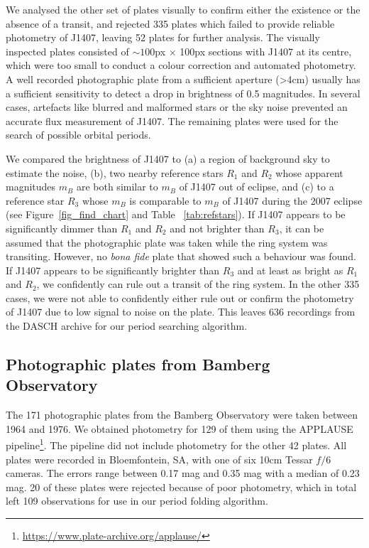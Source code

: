 \documentclass[twocolumn]{aa}
\begin{document}
We analysed the other set of plates visually to confirm either the existence or the absence of a transit, and rejected 335 plates which failed to provide reliable photometry of J1407, leaving 52 plates for further analysis.
%
The visually inspected plates consisted of $\sim 100$px $\times$ 100px sections with J1407 at its centre, which were too small to conduct a colour correction and automated photometry.
%
A well recorded photographic plate from a sufficient aperture (>4cm) usually has a sufficient sensitivity to  detect a drop in brightness of 0.5 magnitudes.
%
In several cases, artefacts like blurred and malformed stars or the sky noise prevented an accurate flux measurement of J1407.
%
The remaining plates were used for the search of possible orbital periods.

We compared the brightness of J1407 to (a) a region of background sky to estimate the noise, (b), two nearby reference stars $R_1$ and $R_2$ whose apparent magnitudes $m_B$ are both similar to $m_B$ of J1407 out of eclipse, and (c) to a reference star $R_3$ whose $m_B$ is comparable to $m_B$ of J1407 during the 2007 eclipse (see Figure~\ref{fig_find_chart} and Table ~\ref{tab:refstars}).
%
If J1407 appears to be significantly dimmer than $R_1$ and $R_2$ and not brighter than $R_3$, it can be assumed that the photographic plate was taken while the ring system was transiting.
%
However, no {\it bona fide} plate that showed such a behaviour was found.
%
If J1407 appears to be significantly brighter than $R_3$ and at least as bright as $R_1$ and $R_2$, we confidently can rule out a transit of the ring system.
% 
In the other 335 cases, we were not able to confidently either rule out or confirm the photometry of J1407 due to low signal to noise on the plate. This leaves 636 recordings from the DASCH archive for our period searching algorithm.

\subsection{Photographic plates from Bamberg Observatory}

The 171 photographic plates from the Bamberg Observatory were taken between 1964 and 1976.
%
We obtained photometry for 129 of them using the APPLAUSE pipeline\footnote{\url{https://www.plate-archive.org/applause/}}.
%
The pipeline did not include photometry for the other 42 plates.
%
All plates were recorded in Bloemfontein, SA, with one of six 10cm Tessar $f/6$ cameras.
%
The errors range between 0.17 mag and 0.35 mag with a median of 0.23 mag.
%
20 of these plates were rejected because of poor photometry, which in total left 109 observations for use in our period folding algorithm.
\end{document}
